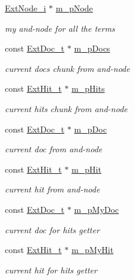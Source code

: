 \begin{DoxyCompactItemize}
\item 
\hyperlink{classExtNode__i}{Ext\-Node\-\_\-i} $\ast$ \hyperlink{classExtNWayT_a7d217596cb08caafd98d8906ad121403}{m\-\_\-p\-Node}
\begin{DoxyCompactList}\small\item\em my and-\/node for all the terms \end{DoxyCompactList}\item 
const \hyperlink{structExtDoc__t}{Ext\-Doc\-\_\-t} $\ast$ \hyperlink{classExtNWayT_a6c89c11051d51dacaa87cde3df1e075e}{m\-\_\-p\-Docs}
\begin{DoxyCompactList}\small\item\em current docs chunk from and-\/node \end{DoxyCompactList}\item 
const \hyperlink{structExtHit__t}{Ext\-Hit\-\_\-t} $\ast$ \hyperlink{classExtNWayT_a32939fecb6b143a06827474beb012f0c}{m\-\_\-p\-Hits}
\begin{DoxyCompactList}\small\item\em current hits chunk from and-\/node \end{DoxyCompactList}\item 
const \hyperlink{structExtDoc__t}{Ext\-Doc\-\_\-t} $\ast$ \hyperlink{classExtNWayT_a742a2d7095e8838c786d73f9a81244ea}{m\-\_\-p\-Doc}
\begin{DoxyCompactList}\small\item\em current doc from and-\/node \end{DoxyCompactList}\item 
const \hyperlink{structExtHit__t}{Ext\-Hit\-\_\-t} $\ast$ \hyperlink{classExtNWayT_a3830765f51cc9f63d55546a69409b293}{m\-\_\-p\-Hit}
\begin{DoxyCompactList}\small\item\em current hit from and-\/node \end{DoxyCompactList}\item 
const \hyperlink{structExtDoc__t}{Ext\-Doc\-\_\-t} $\ast$ \hyperlink{classExtNWayT_a884e4d44222ebfa66f6f91da110a853d}{m\-\_\-p\-My\-Doc}
\begin{DoxyCompactList}\small\item\em current doc for hits getter \end{DoxyCompactList}\item 
const \hyperlink{structExtHit__t}{Ext\-Hit\-\_\-t} $\ast$ \hyperlink{classExtNWayT_aa4353d3f8c4cdfbd72f58d86ea714882}{m\-\_\-p\-My\-Hit}
\begin{DoxyCompactList}\small\item\em current hit for hits getter \end{DoxyCompactList}\item 

\end{DoxyCompactItemize}
